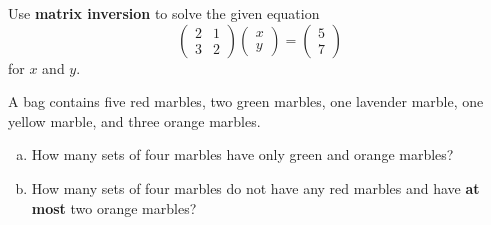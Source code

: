 \documentclass[12pt]{amsart}
\begin{document}
\begin{thm}[10 Points]
  Use {\bf matrix inversion} to solve the given equation
  $$\left(\begin{array}{rr}
    2 & 1 \\
    3 & 2
  \end{array}\right) \left(\begin{array}{r}
    x \\
    y
  \end{array}\right) = \left(\begin{array}{r}
    5 \\
    7
  \end{array}\right)$$
  for $x$ and $y$.
  
\end{thm}
\newpage


\begin{thm}[10 Points]\label{ex1}
  A bag contains five red marbles, two green marbles, one lavender marble, one yellow marble, and three orange marbles.
  \begin{enumerate}[(a)]
  \item
    How many sets of four marbles have only green and orange marbles?
    \vspace{2in}
  \item
    How many sets of four marbles do not have any red marbles and have {\bf at most} two orange marbles?
    \vspace{2in}
  \end{enumerate}
\end{thm}

\newpage


\end{document}
